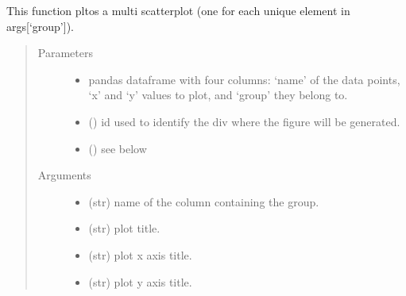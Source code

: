 \documentclass[letterpaper,10pt,english]{sphinxmanual}
\begin{document}

\begin{fulllineitems}
\label{\detokenize{_autosummary/analytics_core.viz:analytics_core.viz.viz.get_scatterplot_matrix}}
This function pltos a multi scatterplot (one for each unique element in args{[}‘group’{]}).
\begin{quote}\begin{description}
\item[{Parameters}] \leavevmode\begin{itemize}
\item {} 
 \textendash{} pandas dataframe with four columns: ‘name’ of the data points, ‘x’ and ‘y’ values to plot, and ‘group’ they belong to.

\item {} 
 () \textendash{} id used to identify the div where the figure will be generated.

\item {} 
 () \textendash{} see below

\end{itemize}

\item[{Arguments}] \leavevmode\begin{itemize}
\item {} 
 (str) \textendash{} name of the column containing the group.

\item {} 
 (str) \textendash{} plot title.

\item {} 
 (str) \textendash{} plot x axis title.

\item {} 
 (str) \textendash{} plot y axis title.


\end{itemize}
\end{description}
\end{quote}
\end{fulllineitems}
\end{document}
